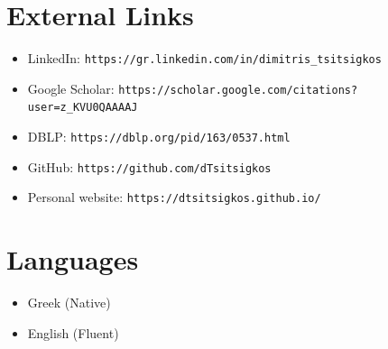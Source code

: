 \documentclass[a4paper,10pt]{article}
\begin{document}









	
		
	
	


\section{External Links}
\begin{itemize}
	\item LinkedIn: \texttt{https://gr.linkedin.com/in/dimitris\_tsitsigkos}
	\item Google Scholar: \texttt{https://scholar.google.com/citations?user=z\_KVU0QAAAAJ}
	\item DBLP: \texttt{https://dblp.org/pid/163/0537.html}
	\item GitHub: \texttt{https://github.com/dTsitsigkos}
	\item Personal website: \texttt{https://dtsitsigkos.github.io/}
\end{itemize}


\section{Languages}
\begin{itemize}
	\item Greek (Native)
	\item English (Fluent)
\end{itemize}



	
\end{document}
